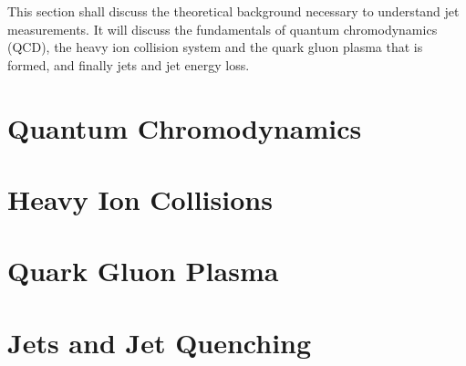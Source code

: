 This section shall discuss the theoretical background necessary to understand jet measurements. It will discuss the fundamentals of quantum chromodynamics (QCD), the heavy ion collision system and the quark gluon plasma that is formed, and finally jets and jet energy loss. 

\section{Quantum Chromodynamics}
\label{sec:qcd}


\section{Heavy Ion Collisions}
\label{sec:HICollisions}


\section{Quark Gluon Plasma}
\label{sec:qgp}


\section{Jets and Jet Quenching}
\label{sec:jets}

